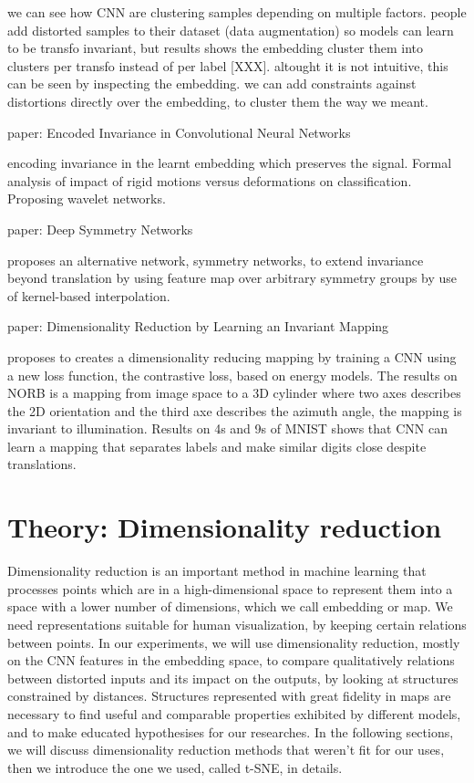 \documentclass[a4paper,12pt]{report}
\begin{document}
we can see how CNN are clustering samples depending on multiple factors.
people add distorted samples to their dataset (data augmentation) so models can learn to be transfo invariant, but results shows the embedding cluster them into clusters per transfo instead of per label [XXX].
altought it is not intuitive, this can be seen by inspecting the embedding.
we can add constraints against distortions directly over the embedding, to cluster them the way we meant.

paper: Encoded Invariance in Convolutional Neural Networks

encoding invariance in the learnt embedding which preserves the signal.
Formal analysis of impact of rigid motions versus deformations on classification.
Proposing wavelet networks.

paper: Deep Symmetry Networks

proposes an alternative network, symmetry networks, to extend invariance beyond translation by using feature map over arbitrary symmetry groups by use of kernel-based interpolation.

paper: Dimensionality Reduction by Learning an Invariant Mapping

proposes to creates a dimensionality reducing mapping by training a CNN using a new loss function, the contrastive loss, based on energy models.
The results on NORB is a mapping from image space to a 3D cylinder where two axes describes the 2D orientation and the third axe describes the azimuth angle, the mapping is invariant to illumination.
Results on 4s and 9s of MNIST shows that CNN can learn a mapping that separates labels and make similar digits close despite translations.


\chapter{Theory: Dimensionality reduction}
Dimensionality reduction is an important method in machine learning that processes points which are in a high-dimensional space to represent them into a space with a lower number of dimensions, which we call embedding or map.
We need representations suitable for human visualization, by keeping certain relations between points.
In our experiments, we will use dimensionality reduction, mostly on the CNN features in the embedding space, to compare qualitatively relations between distorted inputs and its impact on the outputs, by looking at structures constrained by distances.
Structures represented with great fidelity in maps are necessary to find useful and comparable properties exhibited by different models, and to make educated hypothesises for our researches.
In the following sections, we will discuss dimensionality reduction methods that weren't fit for our uses, then we introduce the one we used, called t-SNE, in details.
\end{document}
